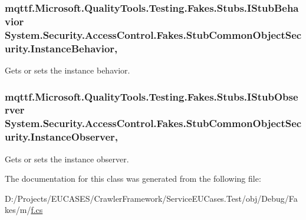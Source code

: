 \hypertarget{class_system_1_1_security_1_1_access_control_1_1_fakes_1_1_stub_common_object_security_a7983dd4607e00f2f2968201eb4f1c34d}{
\subsubsection[{Instance\-Behavior}]{\setlength{\rightskip}{0pt plus 5cm}mqttf.\-Microsoft.\-Quality\-Tools.\-Testing.\-Fakes.\-Stubs.\-I\-Stub\-Behavior System.\-Security.\-Access\-Control.\-Fakes.\-Stub\-Common\-Object\-Security.\-Instance\-Behavior\hspace{0.3cm}{\ttfamily [get]}, {\ttfamily [set]}}}\label{class_system_1_1_security_1_1_access_control_1_1_fakes_1_1_stub_common_object_security_a7983dd4607e00f2f2968201eb4f1c34d}


Gets or sets the instance behavior.

\hypertarget{class_system_1_1_security_1_1_access_control_1_1_fakes_1_1_stub_common_object_security_a262ffcda1b07b9f268ce292233e5bb24}{
\subsubsection[{Instance\-Observer}]{\setlength{\rightskip}{0pt plus 5cm}mqttf.\-Microsoft.\-Quality\-Tools.\-Testing.\-Fakes.\-Stubs.\-I\-Stub\-Observer System.\-Security.\-Access\-Control.\-Fakes.\-Stub\-Common\-Object\-Security.\-Instance\-Observer\hspace{0.3cm}{\ttfamily [get]}, {\ttfamily [set]}}}\label{class_system_1_1_security_1_1_access_control_1_1_fakes_1_1_stub_common_object_security_a262ffcda1b07b9f268ce292233e5bb24}


Gets or sets the instance observer.



The documentation for this class was generated from the following file\-:\begin{DoxyCompactItemize}
\item 
D\-:/\-Projects/\-E\-U\-C\-A\-S\-E\-S/\-Crawler\-Framework/\-Service\-E\-U\-Cases.\-Test/obj/\-Debug/\-Fakes/m/\hyperlink{m_2f_8cs}{f.\-cs}\end{DoxyCompactItemize}
